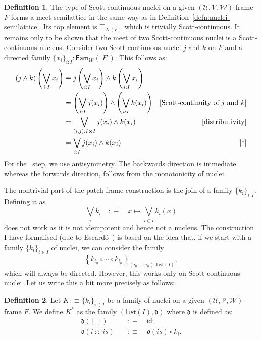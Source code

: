 \documentclass[a4paper, 10pt]{article}
\theoremstyle{definition}
\newtheorem{defn}{Definition}
\newcommand{\paren}[1]{\left( #1 \right)}
\newcommand{\UU}{\mathcal{U}}
\newcommand{\VV}{\mathcal{V}}
\newcommand{\WW}{\mathcal{W}}
\begin{document}
\begin{defn}\label{defn:sc-nuclei-semilattice}
  The type of Scott-continuous nuclei on a given $(\UU, \VV, \WW)$-frame $F$ forms a
  meet-semilattice in the same way as in Definition~\ref{defn:nuclei-semilattice}. Its top element
  is $\top_{\mathcal{N}(F)}$ which is trivially Scott-continuous. It remains only to be shown that the
  meet of two Scott-continuous nuclei is a Scott-continuous nucleus. Consider two Scott-continuous
  nuclei $j$ and $k$ on $F$ and a directed family $\{ x_i \}_{i : I} : \mathsf{Fam}_{\WW}(| F |)$.
  This follows as:
  \begin{align*}
    (j \wedge k) \left( \bigvee_{i : I} x_i \right)
    &\equiv j \left( \bigvee_{i : I} x_i \right) \wedge k \left( \bigvee_{i : I} x_i \right) & \\
    &= \paren{ \bigvee_{i : I} j(x_i) } \wedge \paren{ \bigvee_{i : I} k(x_i) } & [\text{Scott-continuity of $j$ and $k$}]\\
    &= \bigvee_{(i, j) : I \times I} j(x_i) \wedge k(x_i) & [\text{distributivity}]\\
    &= \bigvee_{i : I} j(x_i) \wedge k(x_i) & [\text{\dag}]
  \end{align*}
  For the \dag\ step, we use antisymmetry. The backwards direction is immediate whereas the forwards
  direction, follows from the monotonicity of nuclei.
\end{defn}

The nontrivial part of the patch frame construction is the join of a family $\{ k_i \}_{i : I}$.
Defining it as
\begin{equation*}
  \bigvee_i k_i \quad:\equiv\quad x \mapsto \bigvee_{i \in I} k_i(x)
\end{equation*}
does not work as it is not idempotent and hence not a nucleus. The construction I have formalised
(due to Escard\'{o}~\cite{properly-injective}) is based on the idea that, if we start with a family
$\{ k_i \}_{i \in I}$ of nuclei, we can consider the family
\begin{equation*}
  \left\{ k_{i_0} \circ \cdots \circ k_{i_n} \right\}_{(i_0, \cdots, i_n) : \mathsf{List}(I)},
\end{equation*}
which will always be directed. However, this works only on Scott-continuous
nuclei. Let us write this a bit more precisely as follows:

\begin{defn}
  Let $K :\equiv \{ k_i \}_{i \in I}$ be a family of nuclei on a given
  $(\UU, \VV, \WW)$-frame $F$. We define $K^*$ as
  the family $(\mathsf{List}(I), \mathfrak{d})$ where $\mathfrak{d}$ is defined
  as:
  \begin{align*}
    \mathfrak{d}(\mathtt{[\ ]})      \quad&:\equiv\quad \mathsf{id}; \\
    \mathfrak{d}(i\ \mathtt{::}\ is) \quad&:\equiv\quad \mathfrak{d}(is) \circ k_i.
  \end{align*}
\end{defn}
\end{document}
